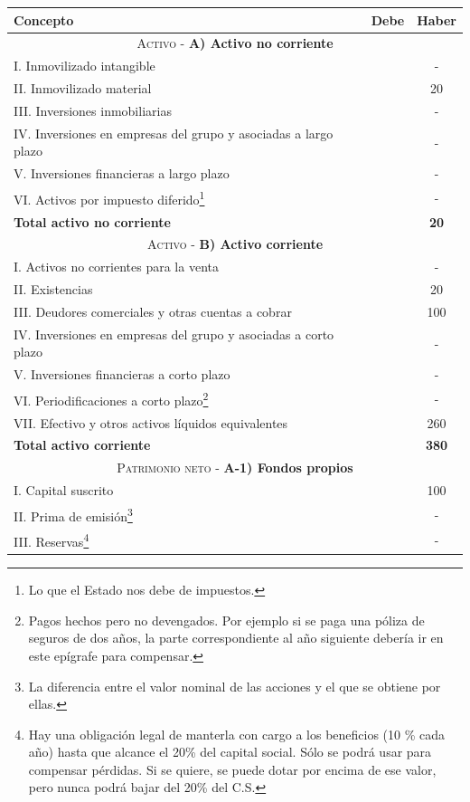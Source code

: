 \documentclass[nochap,palatino,shortheader]{apuntes}
\begin{document}
\begin{table}[hbtp]
\begin{minipage}{\textwidth}
\footnotesize
\centering
\begin{tabular}{l|c|c}
\textbf{Concepto} & \textbf{Debe} & \textbf{Haber} \\ \toprule
\multicolumn{3}{c}{\textsc{Activo} - \textbf{A) Activo no corriente}} \\ \midrule
I. Inmovilizado intangible & & - \\
II. Inmovilizado material & & 20 \\
III. Inversiones inmobiliarias & & - \\
IV. Inversiones en empresas del grupo y asociadas a largo plazo & & - \\
V. Inversiones financieras a largo plazo & & - \\
VI. Activos por impuesto diferido\footnote{Lo que el Estado nos debe de impuestos.} & & - \\
\textbf{Total activo no corriente} & & \textbf{20} \\ \midrule
\multicolumn{3}{c}{\textsc{Activo} - \textbf{B) Activo corriente}} \\ \midrule
I. Activos no corrientes para la venta & & - \\
II. Existencias & & 20 \\
III. Deudores comerciales y otras cuentas a cobrar & & 100 \\
IV. Inversiones en empresas del grupo y asociadas a corto plazo & & - \\
V. Inversiones financieras a corto plazo & & - \\
VI. Periodificaciones a corto plazo\footnote{Pagos hechos pero no devengados. Por ejemplo si se paga una póliza de seguros de dos años, la parte correspondiente al año siguiente debería ir en este epígrafe para compensar.} & & - \\
VII. Efectivo y otros activos líquidos equivalentes & & 260 \\
\textbf{Total activo corriente} & & \textbf{380} \\ \midrule
\multicolumn{3}{c}{\textsc{Patrimonio neto} - \textbf{A-1) Fondos propios}} \\ \midrule
I. Capital suscrito & & 100 \\
II. Prima de emisión\footnote{La diferencia entre el valor nominal de las acciones y el que se obtiene por ellas.} & & - \\
III. Reservas\footnote{Hay una obligación legal de manterla con cargo a los beneficios (10 \% cada año) hasta que alcance el 20\% del capital social. Sólo se podrá usar para compensar pérdidas. Si se quiere, se puede dotar por encima de ese valor, pero nunca podrá bajar del 20\% del C.S.} & & - \\

\end{tabular}
\end{minipage}
\end{table}
\end{document}
